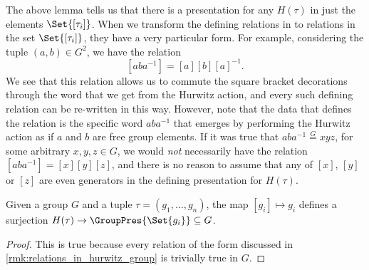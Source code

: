 \begin{remark}
	\label{rmk:relations_in_hurwitz_group}
	The above lemma tells us that there is a presentation for any $H(\tau)$ in just the elements $\Set{[\tau_i]} $.
	When we transform the defining relations in to relations in the set $\Set{[\tau_i]} $, they have a very particular form.
	For example, considering the tuple $(a,b) \in G^2$, we have the relation
	\[
		[aba^{-1}]=[a][b][a]^{-1}
		.\]
	We see that this relation allows us to commute the square bracket decorations through the word that we get from the Hurwitz action, and every such defining relation can be re-written in this way.
	However, note that the data that defines the relation is the specific word $aba^{-1}$ that emerges by performing the Hurwitz action as if $a$ and $b$ are free group elements.
	If it was true that $aba^{-1} \stackrel{G}{=} xyz$, for some arbitrary $x,y,z \in G$, we would \emph{not} necessarily have the relation $[aba^{-1}]=[x][y][z]$, and there is no reason to assume that any of $[x]$, $[y]$ or $[z]$ are even generators in the defining presentation for $H(\tau)$.
\end{remark}

\begin{lemma}
	\label{lem:hurwitz_to_G_homomorphism}
	Given a group $G$ and a tuple $\tau = (g_1,\ldots,g_n)$, the map $[g_i] \mapsto g_i$ defines a surjection $H(\tau) \to \GroupPres{\Set{g_i}} \subseteq  G$.
\end{lemma}
\begin{proof}
	This is true because every relation of the form discussed in \cref{rmk:relations_in_hurwitz_group} is trivially true in  $G$.
\end{proof}

